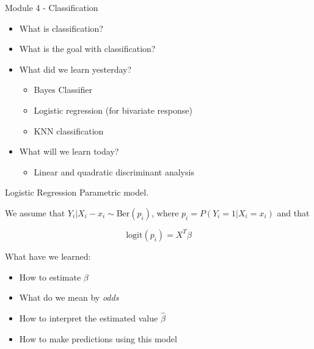 \documentclass[
  10pt,
  ignorenonframetext,
]{beamer}
\providecommand{\tightlist}{%
  \setlength{\itemsep}{0pt}\setlength{\parskip}{0pt}}
\begin{document}
\begin{frame}{Module 4 - Classification}
\protect\hypertarget{module-4---classification}{}
\begin{itemize}
\item
  What is classification?
\item
  What is the goal with classification?
\item
  What did we learn yesterday?

  \begin{itemize}
  \tightlist
  \item
    Bayes Classifier
  \item
    Logistic regression (for bivariate response)
  \item
    KNN classification
  \end{itemize}
\item
  What will we learn today?

  \begin{itemize}
  \tightlist
  \item
    Linear and quadratic discriminant analysis
  \end{itemize}
\end{itemize}
\end{frame}

\begin{frame}{Logistic Regression}
\protect\hypertarget{logistic-regression-1}{}
Parametric model.

\vspace{1mm}

We assume that \(Y_i|X_i-x_i\sim\text{Ber}(p_i)\), where
\(p_i = P(Y_i =1|X_i = x_i)\) and that

\[
\text{logit}(p_i) = X^T\beta
\] \vspace{1mm}

What have we learned:

\begin{itemize}
\tightlist
\item
  How to estimate \(\beta\)
\item
  What do we mean by \emph{odds}
\item
  How to interpret the estimated value \(\hat{\beta}\)
\item
  How to make predictions using this model
\end{itemize}
\end{frame}
\end{document}
